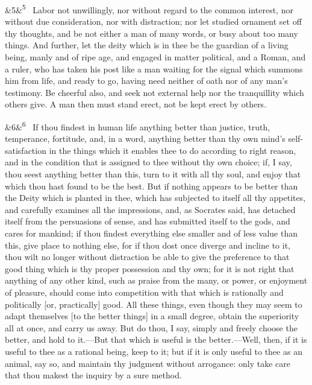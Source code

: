 \documentclass[12pt]{article}
\newcommand{\para}[1][]{\par\noindent\ifx&#1&\else\textsuperscript{\footnotesize #1}~\fi}
\begin{document}
\para[5] Labor not unwillingly, nor without regard to the common interest, nor
without due consideration, nor with distraction; nor let studied
ornament set off thy thoughts, and be not either a man of many words, or
busy about too many things. And further, let the deity which is in thee
be the guardian of a living being, manly and of ripe age, and engaged in
matter political, and a Roman, and a ruler, who has taken his post like
a man waiting for the signal which summons him from life, and ready to
go, having need neither of oath nor of any man's testimony. Be cheerful
also, and seek not external help nor the tranquillity which others
give. A man then must stand erect, not be kept erect by others.

\para[6] If thou findest in human life anything better than justice, truth,
temperance, fortitude, and, in a word, anything better than thy own
mind's self-satisfaction in the things which it enables thee to do
according to right reason, and in the condition that is assigned to thee
without thy own choice; if, I say, thou seest anything better than this,
turn to it with all thy soul, and enjoy that which thou hast found to be
the best. But if nothing appears to be better than the Deity which is
planted in thee, which has subjected to itself all thy appetites, and
carefully examines all the impressions, and, as Socrates said, has
detached itself from the persuasions of sense, and has submitted itself
to the gods, and cares for mankind; if thou findest everything else
smaller and of less value than this, give place to nothing else, for if
thou dost once diverge and incline to it, thou wilt no longer without
distraction be able to give the preference to that good thing which is
thy proper possession and thy own; for it is not right that anything of
any other kind, such as praise from the many, or power, or enjoyment of
pleasure, should come into competition with that which is rationally and
politically [or, practically] good. All these things, even though they
may seem to adapt themselves [to the better things] in a small degree,
obtain the superiority all at once, and carry us away. But do thou, I
say, simply and freely choose the better, and hold to it.---But that
which is useful is the better.---Well, then, if it is useful to thee as a
rational being, keep to it; but if it is only useful to thee as an
animal, say so, and maintain thy judgment without arrogance: only take
care that thou makest the inquiry by a sure method.
\end{document}
